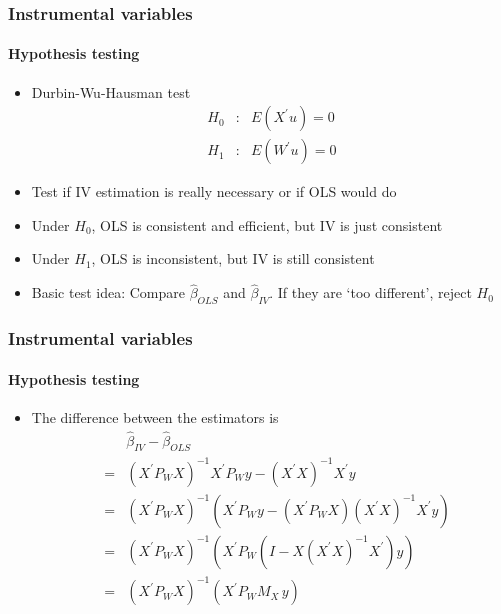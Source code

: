 \documentclass[notes=show]{beamer}
\begin{document}
\begin{frame}\frametitle{Instrumental variables}\framesubtitle{Hypothesis testing}
\begin{itemize}
    \item Durbin-Wu-Hausman test
    \begin{eqnarray*}
        H_{0} &:&E\left( X^{\prime }u\right) =0 \\
        H_{1} &:&E\left( W^{\prime }u\right) =0
    \end{eqnarray*}
    \item Test if IV estimation is really necessary or if OLS would do
    \item Under $H_{0}$, OLS is consistent and efficient, but IV is just consistent
    \item Under $H_{1}$, OLS is inconsistent, but IV is still consistent
    \item Basic test idea: Compare $\hat{\beta}_{OLS}$ and $\hat{\beta}_{IV}$. If they are \newline
    `too different', reject $H_{0}$
\end{itemize}
\end{frame}


\begin{frame}\frametitle{Instrumental variables}\framesubtitle{Hypothesis testing}
\begin{itemize}
    \item The difference between the estimators is
    \begin{eqnarray*}
        &&\hat{\beta}_{IV}-\hat{\beta}_{OLS} \\
        &=&\left( X^{\prime }P_{W}X\right) ^{-1}X^{\prime}P_{W}y-\left( X^{\prime}X\right) ^{-1}X^{\prime }y \\
        &=&\left( X^{\prime }P_{W}X\right) ^{-1}\left( X^{\prime}P_{W}y-\left(X^{\prime }P_{W}X\right) \left( X^{\prime }X\right) ^{-1}X^{\prime }y\right)\\
        &=&\left( X^{\prime }P_{W}X\right) ^{-1}\left( X^{\prime}P_{W}\left(I-X\left( X^{\prime }X\right) ^{-1}X^{\prime }\right) y\right)  \\
        &=&\left( X^{\prime }P_{W}X\right) ^{-1}\left( X^{\prime}P_{W}M_{X}\,y\right)
    \end{eqnarray*}
\end{itemize}
\end{frame}
\end{document}
